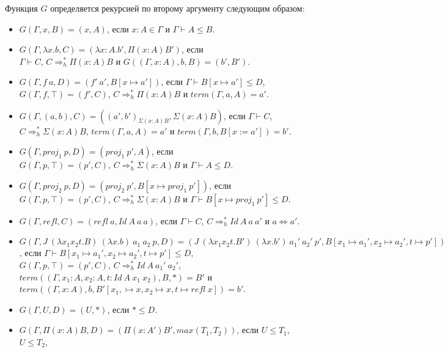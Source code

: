 \documentclass{amsart}
\theoremstyle{definition}
\theoremstyle{remark}
\newcommand{\red}{\Rightarrow}
\newcommand{\deq}{\Leftrightarrow}
\numberwithin{figure}{section}
\begin{document}
Функция $G$ определяется рекурсией по второму аргументу следующим образом:
\begin{itemize}
\item $G(\Gamma, x, B) = (x, A)$, если $x : A \in \Gamma$ и $\Gamma \vdash A \leq B$.
\item $G(\Gamma, \lambda x. b, C) = (\lambda x : A. b', \Pi (x : A) B')$, если \\
    $\Gamma \vdash C$, $C \red_h^* \Pi (x : A) B$ и $G((\Gamma, x : A), b, B) = (b', B')$.
\item $G(\Gamma, f\ a, D) = (f'\ a', B[x \mapsto a'])$, если $\Gamma \vdash B[x \mapsto a'] \leq D$, \\
    $G(\Gamma, f, \top) = (f', C)$, $C \red_h^* \Pi (x : A) B$ и $term(\Gamma, a, A) = a'$.
\item $G(\Gamma, (a, b), C) = ((a', b')_{\Sigma (x : A) B}, \Sigma (x : A) B)$, если $\Gamma \vdash C$, \\
    $C \red_h^* \Sigma (x : A) B$, $term(\Gamma, a, A) = a'$ и $term(\Gamma, b, B[x := a']) = b'$.
\item $G(\Gamma, proj_1\ p, D) = (proj_1\ p', A)$, если \\
    $G(\Gamma, p, \top) = (p', C)$, $C \red_h^* \Sigma (x : A) B$ и $\Gamma \vdash A \leq D$.
\item $G(\Gamma, proj_2\ p, D) = (proj_2\ p', B[x \mapsto proj_1\ p'])$, если \\
    $G(\Gamma, p, \top) = (p', C)$, $C \red_h^* \Sigma (x : A) B$ и $\Gamma \vdash B[x \mapsto proj_1\ p'] \leq D$.
\item $G(\Gamma, refl, C) = (refl\ a, Id\ A\ a\ a)$, если $\Gamma \vdash C$, $C \red_h^* Id\ A\ a\ a'$ и $a \deq a'$.
\item $G(\Gamma, J\ (\lambda x_1 x_2 t. B)\ (\lambda x. b)\ a_1\ a_2\ p, D) = (J\ (\lambda x_1 x_2 t. B')\ (\lambda x. b')\ a_1'\ a_2'\ p', B[x_1 \mapsto a_1', x_2 \mapsto a_2', t \mapsto p'])$, если $\Gamma \vdash B[x_1 \mapsto a_1', x_2 \mapsto a_2', t \mapsto p'] \leq D$, \\
    $G(\Gamma, p, \top) = (p', C)$,
    $C \red_h^* Id\ A\ a_1'\ a_2'$, \\
    $term((\Gamma, x_1 : A, x_2 : A, t : Id\ A\ x_1\ x_2), B, *) = B'$ и \\
    $term((\Gamma, x : A), b, B'[x_1, \mapsto x, x_2 \mapsto x, t \mapsto refl\ x]) = b'$.
\item $G(\Gamma, U, D) = (U, *)$, если $* \leq D$.
\item $G(\Gamma, \Pi (x : A) B, D) = (\Pi (x : A') B', max(T_1, T_2))$, если $U \leq T_1$, $U \leq T_2$, \\

\end{itemize}
\end{document}
